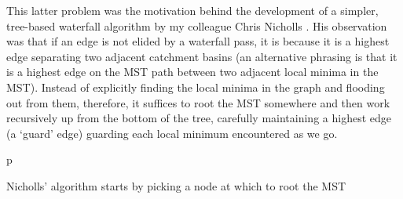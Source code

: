 This latter problem was the motivation behind the development of a simpler, tree-based waterfall algorithm by my colleague Chris Nicholls \cite{nicholls09}. His observation was that if an edge is not elided by a waterfall pass, it is because it is a highest edge separating two adjacent catchment basins (an alternative phrasing is that it is a highest edge on the MST path between two adjacent local minima in the MST). Instead of explicitly finding the local minima in the graph and flooding out from them, therefore, it suffices to root the MST somewhere and then work recursively up from the bottom of the tree, carefully maintaining a highest edge (a `guard' edge) guarding each local minimum encountered as we go.

\begin{stusubfig}{p}
	\hspace{4mm}%
\caption{Nicholls' algorithm starts by picking a node at which to root the MST}%
\label{fig:segmentation-waterfall-nicholls-root}
\end{stusubfig}


